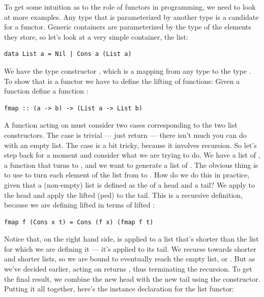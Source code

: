 To get some intuition as to the role of functors in programming, we need
to look at more examples. Any type that is parameterized by another type
is a candidate for a functor. Generic containers are parameterized by
the type of the elements they store, so let's look at a very simple
container, the list:

\begin{verbatim}
data List a = Nil | Cons a (List a)
\end{verbatim}

We have the type constructor , which is a mapping from any
type  to the type . To show that 
is a functor we have to define the lifting of functions: Given a
function  define a function
:

\begin{verbatim}
fmap :: (a -> b) -> (List a -> List b)
\end{verbatim}

A function acting on  must consider two cases
corresponding to the two list constructors. The  case is
trivial --- just return  --- there isn't much you can do
with an empty list. The  case is a bit tricky, because it
involves recursion. So let's step back for a moment and consider what we
are trying to do. We have a list of , a function 
that turns  to , and we want to generate a list of
. The obvious thing is to use  to turn each element
of the list from  to . How do we do this in
practice, given that a (non-empty) list is defined as the 
of a head and a tail? We apply  to the head and apply the
lifted (ped)  to the tail. This is a recursive
definition, because we are defining lifted  in terms of lifted
:

\begin{verbatim}
fmap f (Cons x t) = Cons (f x) (fmap f t)
\end{verbatim}

Notice that, on the right hand side,  is applied to a
list that's shorter than the list for which we are defining it --- it's
applied to its tail. We recurse towards shorter and shorter lists, so we
are bound to eventually reach the empty list, or . But as
we've decided earlier,  acting on  returns
, thus terminating the recursion. To get the final result,
we combine the new head  with the new tail
 using the  constructor. Putting it
all together, here's the instance declaration for the list functor:

